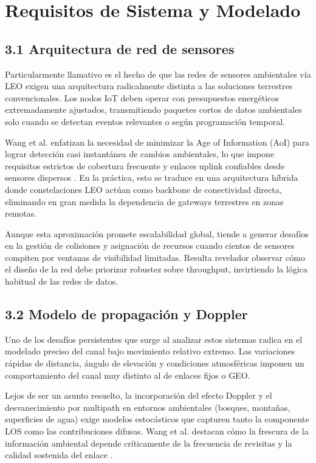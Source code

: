 \section{Requisitos de Sistema y Modelado}

\subsection{3.1 Arquitectura de red de sensores}

Particularmente llamativo es el hecho de que las redes de sensores ambientales vía LEO exigen una arquitectura radicalmente distinta a las soluciones terrestres convencionales. Los nodos IoT deben operar con presupuestos energéticos extremadamente ajustados, transmitiendo paquetes cortos de datos ambientales solo cuando se detectan eventos relevantes o según programación temporal. 

Wang et al. enfatizan la necesidad de minimizar la Age of Information (AoI) para lograr detección casi instantánea de cambios ambientales, lo que impone requisitos estrictos de cobertura frecuente y enlaces uplink confiables desde sensores dispersos \cite{Wang2026}. En la práctica, esto se traduce en una arquitectura híbrida donde constelaciones LEO actúan como backbone de conectividad directa, eliminando en gran medida la dependencia de gateways terrestres en zonas remotas.

Aunque esta aproximación promete escalabilidad global, tiende a generar desafíos en la gestión de colisiones y asignación de recursos cuando cientos de sensores compiten por ventanas de visibilidad limitadas. Resulta revelador observar cómo el diseño de la red debe priorizar robustez sobre throughput, invirtiendo la lógica habitual de las redes de datos.

\subsection{3.2 Modelo de propagación y Doppler}

Uno de los desafíos persistentes que surge al analizar estos sistemas radica en el modelado preciso del canal bajo movimiento relativo extremo. Las variaciones rápidas de distancia, ángulo de elevación y condiciones atmosféricas imponen un comportamiento del canal muy distinto al de enlaces fijos o GEO.

Lejos de ser un asunto resuelto, la incorporación del efecto Doppler y el desvanecimiento por multipath en entornos ambientales (bosques, montañas, superficies de agua) exige modelos estocásticos que capturen tanto la componente LOS como las contribuciones difusas. Wang et al. destacan cómo la frescura de la información ambiental depende críticamente de la frecuencia de revisitas y la calidad sostenida del enlace \cite{Wang2026}.

